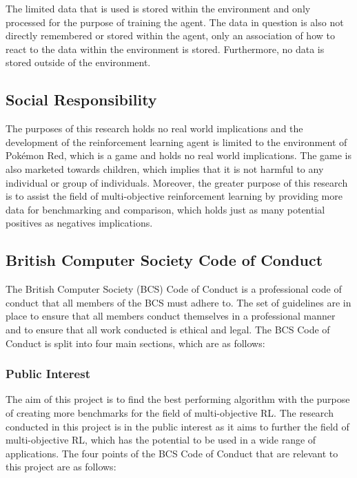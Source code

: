 The limited data that is used is stored within the environment and only processed for the purpose of training the agent. The data in question is also not directly remembered or stored within the agent, only an association of how to react to the data within the environment is stored. Furthermore, no data is stored outside of the environment. 

\subsection{Social Responsibility}

The purposes of this research holds no real world implications and the development of the reinforcement learning agent is limited to the environment of Pokémon Red, which is a game and holds no real world implications. The game is also marketed towards children, which implies that it is not harmful to any individual or group of individuals. Moreover, the greater purpose of this research is to assist the field of multi-objective reinforcement learning by providing more data for benchmarking and comparison, which holds just as many potential positives as negatives implications.

\subsection{British Computer Society Code of Conduct}

The British Computer Society (BCS) Code of Conduct is a professional code of conduct that all members of the BCS must adhere to. The set of guidelines are in place to ensure that all members conduct themselves in a professional manner and to ensure that all work conducted is ethical and legal. \cite{BSC2022codeofconduct} The BCS Code of Conduct is split into four main sections, which are as follows:

\subsubsection*{Public Interest}

The aim of this project is to find the best performing algorithm with the purpose of creating more benchmarks for the field of multi-objective RL. The research conducted in this project is in the public interest as it aims to further the field of multi-objective RL, which has the potential to be used in a wide range of applications. The four points of the BCS Code of Conduct that are relevant to this project are as follows:

